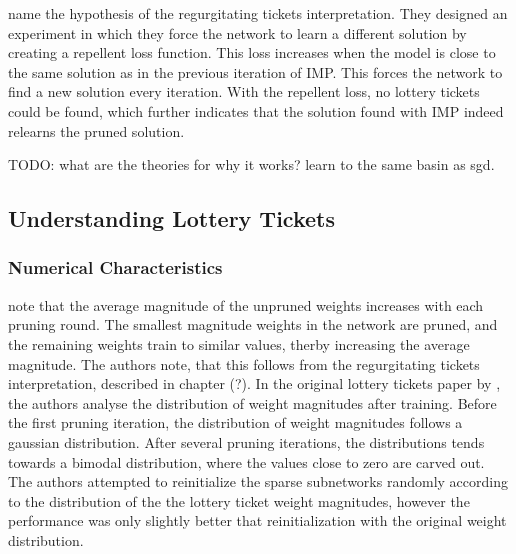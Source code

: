 \textcite{maene_towards_2021} name the hypothesis of \autocite{WhyLotteryTicketsWin} the regurgitating tickets interpretation.
They designed an experiment in which they force the network to learn a different solution by creating a repellent loss function.
This loss increases when the model is close to the same solution as in the previous iteration of IMP.
This forces the network to find a new solution every iteration.
With the repellent loss, no lottery tickets could be found, which further indicates that the solution found with IMP indeed relearns the pruned solution.

TODO: what are the theories for why it works? learn to the same basin as sgd.

\subsection{Understanding Lottery Tickets}
\subsubsection{Numerical Characteristics}
\autocite{maene_towards_2021} note that the average magnitude of the unpruned weights increases with each pruning round. The smallest magnitude weights in the network are pruned, and the remaining weights train to similar values, therby increasing the average magnitude. The authors note, that this follows from the regurgitating tickets interpretation, described in chapter (?).
In the original lottery tickets paper by \textcite{DBLP:conf/iclr/FrankleC19}, the authors analyse the distribution of weight magnitudes after training. Before the first pruning iteration, the distribution of weight magnitudes follows a gaussian distribution. After several pruning iterations, the distributions tends towards a bimodal distribution, where the values close to zero are carved out.
The authors attempted to reinitialize the sparse subnetworks randomly according to the distribution of the the lottery ticket weight magnitudes, however the performance was only slightly better that reinitialization with the original weight distribution.

